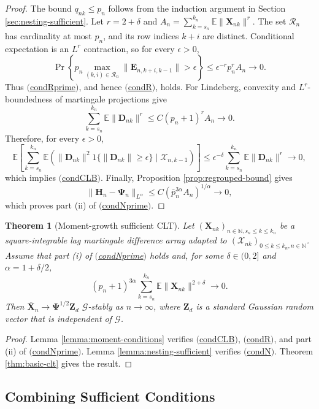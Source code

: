 \documentclass[11pt]{article}
\renewcommand\vec[1]{\boldsymbol{#1}}
\newcommand\mat[1]{\mathbf{#1}}
\newcommand{\E}{\mathbb{E}}
\newcommand{\N}{\mathbb{N}}
\newcommand{\G}{\mathcal{G}}
\newcommand{\X}{\mathcal{X}}
\newcommand{\RR}{\mathcal{R}}
\newcommand{\refitem}[1]{$\mathrm{(}$\hyperlink{cond:#1}{\csname cond#1\endcsname}$\mathrm{)}$}
\newtheorem{theorem}{Theorem}
\theoremstyle{definition}
\begin{document}
\begin{proof}
The bound \(q_{nk}\leq p_n\) follows from the induction argument in Section \ref{sec:nesting-sufficient}.
Let \(r=2+\delta\) and \(A_n=\sum_{k=s_n}^{k_n}\E\|\vec{X}_{nk}\|^r\).
The set \(\RR_n\) has cardinality at most \(p_n\), and its row indices \(k+i\) are distinct.
Conditional expectation is an \(L^r\) contraction, so for every \(\epsilon>0\),
\[
\Pr\left\{
p_n\max_{(k,i)\in\RR_n}\|\vec{E}_{n,k+i,k-1}\|>\epsilon
\right\}
\leq
\epsilon^{-r}p_n^rA_n
\to0.
\]
Thus \refitem{Rprime}, and hence \refitem{R}, holds.
For Lindeberg, convexity and \(L^r\)-boundedness of martingale projections give
\[
\sum_{k=s_n}^{k_n}\E\|\vec{D}_{nk}\|^r
\leq
C(p_n+1)^rA_n
\to0.
\]
Therefore, for every \(\epsilon>0\),
\[
\E\left[
\sum_{k=s_n}^{k_n}
\E\left(
\|\vec{D}_{nk}\|^2 1\{\|\vec{D}_{nk}\|\geq\epsilon\}
\mid\X_{n,k-1}
\right)
\right]
\leq
\epsilon^{-\delta}\sum_{k=s_n}^{k_n}\E\|\vec{D}_{nk}\|^r
\to0,
\]
which implies \refitem{CLB}.
Finally, Proposition \ref{prop:regrouped-bound} gives
\[
\|\mat{H}_n-\mat{\Psi}_n\|_{L^\alpha}
\leq
C(\bar p_n^{3\alpha}A_n)^{1/\alpha}
\to0,
\]
which proves part (ii) of \refitem{Nprime}.
\end{proof}

\begin{theorem}[Moment-growth sufficient CLT]\label{thm:moment-growth-clt}
Let $(\vec{X}_{nk})_{n \in \N, s_n \leq k \leq k_n}$ be a square-integrable lag martingale difference array adapted to $(\X_{nk})_{0 \leq k \leq k_n, n \in \N}$.
Assume that part (i) of \refitem{Nprime} holds and, for some \(\delta\in(0,2]\) and \(\alpha=1+\delta/2\),
\[
(p_n+1)^{3\alpha}
\sum_{k=s_n}^{k_n}\E\|\vec{X}_{nk}\|^{2+\delta}
\to0.
\]
Then $\overline{\vec{X}}_n \to \mat{\Psi}^{1/2} \vec{Z}_d$ $\G$-stably as $n \to \infty$, where $\vec{Z}_d$ is a standard Gaussian random vector that is independent of $\G$.
\end{theorem}

\begin{proof}
Lemma \ref{lemma:moment-conditions} verifies \refitem{CLB}, \refitem{R}, and part (ii) of \refitem{Nprime}.
Lemma \ref{lemma:nesting-sufficient} verifies \refitem{N}.
Theorem \ref{thm:basic-clt} gives the result.
\end{proof}

\subsection{Combining Sufficient Conditions}\label{sec:sufficient-cor}
\end{document}

